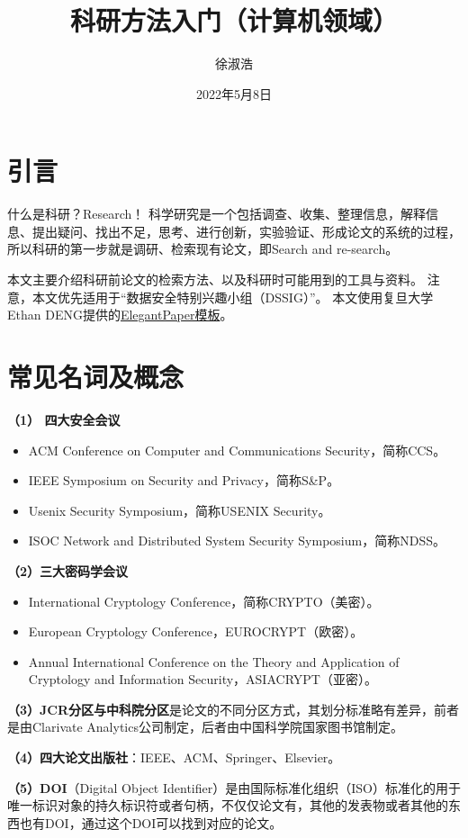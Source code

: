 \documentclass[lang=cn,11pt,a4paper]{elegantpaper}
\title{科研方法入门（计算机领域）}
\author{徐淑浩
 }
\institute{\href{https://faculty.xidian.edu.cn/JT/zh_CN/index.htm}{数据安全特别兴趣小组（DSSIG）}}
\date{2022年5月8日}
\begin{document}
\maketitle

\section{引言}
什么是科研？Research！
科学研究是一个包括调查、收集、整理信息，解释信息、提出疑问、找出不足，思考、进行创新，实验验证、形成论文的系统的过程，所以科研的第一步就是调研、检索现有论文，即Search and re-search。

本文主要介绍科研前论文的检索方法、以及科研时可能用到的工具与资料。
注意，本文优先适用于“数据安全特别兴趣小组（DSSIG）”。
本文使用复旦大学Ethan DENG提供的\href{https://github.com/ElegantLaTeX/ElegantPaper/}{ElegantPaper模板}。

\section{常见名词及概念}
\textbf{（1） 四大安全会议}
\begin{itemize}
  \item ACM Conference on Computer and Communications Security，简称CCS。
  \item IEEE Symposium on Security and Privacy，简称S\&P。
  \item Usenix Security Symposium，简称USENIX Security。
  \item ISOC Network and Distributed System Security Symposium，简称NDSS。
\end{itemize}

\textbf{（2）三大密码学会议}
\begin{itemize}
  \item International Cryptology Conference，简称CRYPTO（美密）。
  \item European Cryptology Conference，EUROCRYPT（欧密）。
  \item Annual International Conference on the Theory and Application of Cryptology and Information Security，ASIACRYPT（亚密）。
\end{itemize}

\textbf{（3）JCR分区与中科院分区}是论文的不同分区方式，其划分标准略有差异，前者是由Clarivate Analytics公司制定，后者由中国科学院国家图书馆制定。

\textbf{（4）四大论文出版社}：IEEE、ACM、Springer、Elsevier。

\textbf{（5）DOI}（Digital Object Identifier）是由国际标准化组织（ISO）标准化的用于唯一标识对象的持久标识符或者句柄，不仅仅论文有，其他的发表物或者其他的东西也有DOI，通过这个DOI可以找到对应的论文。
\end{document}
